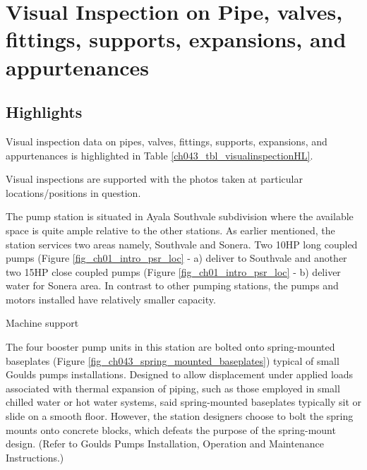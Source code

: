 %

\section{Visual Inspection on Pipe, valves, fittings, supports, expansions, and appurtenances}
\label{ch04mech02}

\subsection{Highlights}
\label{ch04mech02_highlight}

Visual inspection data on pipes, valves, fittings, supports, expansions, and appurtenances is highlighted in Table \ref{ch043_tbl_visualinspectionHL}.



Visual inspections are supported with the photos taken at particular locations/positions in question.

The pump station is situated in Ayala Southvale subdivision where the available space is quite ample relative to the other stations. As earlier mentioned, the station services two areas namely, Southvale and Sonera. Two 10HP long coupled pumps (Figure \ref{fig_ch01_intro_psr_loc} - a) deliver to Southvale and another two 15HP close coupled pumps (Figure \ref{fig_ch01_intro_psr_loc} - b) deliver water for Sonera area. In contrast to other pumping stations, the pumps and motors installed have relatively smaller capacity. 

Machine support

The four booster pump units in this station are bolted onto spring-mounted baseplates (Figure \ref{fig_ch043_spring_mounted_baseplates}) typical of small Goulds pumps installations. Designed to allow displacement under applied loads associated with thermal expansion of piping, such as those employed in small chilled water or hot water systems, said spring-mounted baseplates typically sit or slide on a smooth floor. However, the station designers choose to bolt the spring mounts onto concrete blocks, which defeats the purpose of the spring-mount design. (Refer to Goulds Pumps Installation, Operation and Maintenance Instructions.)

